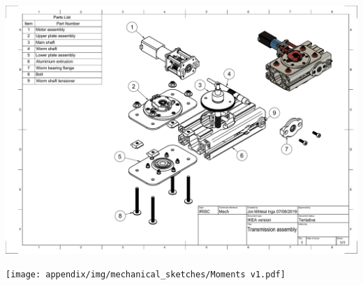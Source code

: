 \begin{landscape}
\includegraphics[scale=0.5]{appendix/img/mechanical_sketches/Transmission_Assembly.pdf}

\texttt{[image: appendix/img/mechanical\_sketches/Moments v1.pdf]}

\end{landscape}
\newpage
% 


